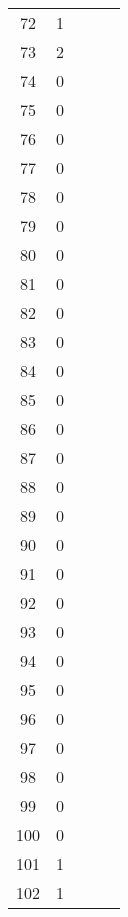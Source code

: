 \begin{center}
\begin{table}[H]
\begin{tabular}{ccccc}
\num{   72} & \num{    1} \\
\num{   73} & \num{    2} \\
\num{   74} & \num{    0} \\
\num{   75} & \num{    0} \\
\num{   76} & \num{    0} \\
\num{   77} & \num{    0} \\
\num{   78} & \num{    0} \\
\num{   79} & \num{    0} \\
\num{   80} & \num{    0} \\
\num{   81} & \num{    0} \\
\num{   82} & \num{    0} \\
\num{   83} & \num{    0} \\
\num{   84} & \num{    0} \\
\num{   85} & \num{    0} \\
\num{   86} & \num{    0} \\
\num{   87} & \num{    0} \\
\num{   88} & \num{    0} \\
\num{   89} & \num{    0} \\
\num{   90} & \num{    0} \\
\num{   91} & \num{    0} \\
\num{   92} & \num{    0} \\
\num{   93} & \num{    0} \\
\num{   94} & \num{    0} \\
\num{   95} & \num{    0} \\
\num{   96} & \num{    0} \\
\num{   97} & \num{    0} \\
\num{   98} & \num{    0} \\
\num{   99} & \num{    0} \\
\num{  100} & \num{    0} \\
\num{  101} & \num{    1} \\
\num{  102} & \num{    1} \\
\bottomrule
\end{tabular}
\end{table}
\end{center}

